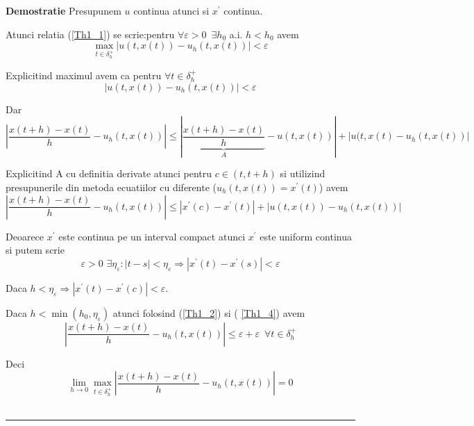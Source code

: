 \documentclass[a4paper,twoside]{book}
\newenvironment{proof}[1][Proof]{\noindent\textbf{Demostratie} }{\ \rule{0.5em}{0.5em}}
\begin{document}
\begin{proof}
Presupunem $u$ continua atunci si $x^{\prime }$ continua.

Atunci relatia (\ref{Th1_1}) se scrie:pentru $\forall \varepsilon
>0\,\,\,\exists h_{0}$ a.i. $h<h_{0}$ avem%
\begin{equation*}
\max_{t\in \delta _{h}^{+}}\left\vert u(t,x(t))-u_{h}(t,x(t))\right\vert
<\varepsilon
\end{equation*}

Explicitind maximul avem ca pentru $\forall t\in \delta _{h}^{+}$%
\begin{equation}
\left\vert u(t,x(t))-u_{h}(t,x(t))\right\vert <\varepsilon  \label{Th1_2}
\end{equation}

Dar%
\begin{equation*}
\left\vert \frac{x(t+h)-x(t)}{h}-u_{h}(t,x(t))\right\vert \leq \left\vert 
\underset{A}{\underbrace{\frac{x(t+h)-x(t)}{h}}}-u(t,x(t))\right\vert
+\left\vert u(t,x(t)-u_{h}(t,x(t))\right\vert
\end{equation*}

Explicitind A cu definitia derivate atunci pentru $c\in (t,t+h)$ si
utilizind presupunerile din metoda ecuatiilor cu diferente ($%
u_{h}(t,x(t))=x^{\prime }(t)$) avem%
\begin{equation}
\left\vert \frac{x(t+h)-x(t)}{h}-u_{h}(t,x(t))\right\vert \leq \left\vert
x^{\prime }(c)-x^{\prime }(t)\right\vert +\left\vert
u(t,x(t))-u_{h}(t,x(t))\right\vert  \label{Th1_3}
\end{equation}

Deoarece $x^{\prime }$ este continua pe un interval compact atunci $%
x^{\prime }$ este uniform continua si putem scrie%
\begin{equation}
\varepsilon >0\,\,\exists \eta _{\varepsilon }:\left\vert t-s\right\vert
<\eta _{\varepsilon }\Rightarrow \left\vert x^{\prime }(t)-x^{\prime
}(s)\right\vert <\varepsilon  \label{Th1_4}
\end{equation}

Daca $h<\eta _{\varepsilon }\Rightarrow \left\vert x^{\prime }(t)-x^{\prime
}(c)\right\vert <\varepsilon $.

Daca $h<\min (h_{0},\eta _{\varepsilon })$ atunci folosind (\ref{Th1_2}) si (%
\ref{Th1_4}) avem%
\begin{equation*}
\left\vert \frac{x(t+h)-x(t)}{h}-u_{h}(t,x(t))\right\vert \leq \varepsilon
+\varepsilon \,\,\,\forall t\in \delta _{h}^{+}
\end{equation*}

Deci%
\begin{equation*}
\lim_{h\rightarrow 0}\max_{t\in \delta _{h}^{+}}\left\vert \frac{x(t+h)-x(t)%
}{h}-u_{h}(t,x(t))\right\vert =0
\end{equation*}
\end{proof}
\end{document}
